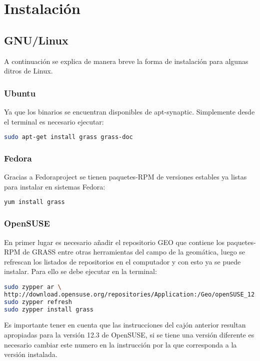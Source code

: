 \documentclass{article}
\begin{document}
\section{Instalación}
\subsection{GNU/Linux}
A continuación se explica de manera breve la forma de instalación para algunas ditros de Linux.

\subsubsection{Ubuntu}
Ya que los binarios se encuentran disponibles de apt-synaptic. Simplemente desde el terminal es necesario ejecutar:

\begin{lstlisting}[language=bash, frame=single]
sudo apt-get install grass grass-doc
\end{lstlisting}

\subsubsection{Fedora}
Gracias a Fedoraproject se tienen paquetes-RPM de versiones estables ya listas para instalar en sistemas Fedora:

\begin{lstlisting}[language=bash, frame=single]
yum install grass
\end{lstlisting}

\subsubsection{OpenSUSE}

En primer lugar es necesario añadir el repositorio GEO que contiene los paquetes-RPM de GRASS entre otras herramientas del campo de la geomática, luego se refrescan los listados de repositorios en el computador y con esto ya se puede instalar. Para ello se debe ejecutar en la terminal:

\begin{lstlisting}[language=bash, frame=single]
sudo zypper ar \
http://download.opensuse.org/repositories/Application:/Geo/openSUSE_12.3/ GEO
sudo zypper refresh
sudo zypper install grass
\end{lstlisting}

Es importante tener en cuenta que las instrucciones del cajón anterior resultan apropiadas para la versión 12.3 de OpenSUSE, si se tiene una versión diferente es necesario cambiar este numero en la instrucción por la que corresponda a la versión instalada.

\end{document}
